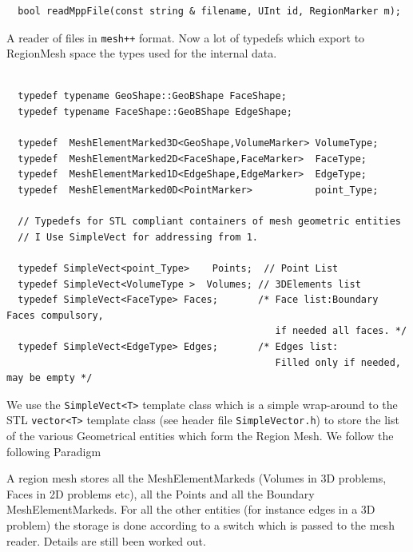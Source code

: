 \begin{verbatim}
  bool readMppFile(const string & filename, UInt id, RegionMarker m);
\end{verbatim}
A reader of files in \texttt{mesh++} format.  Now a lot of typedefs
which export to RegionMesh space the types used for the internal data.
\begin{verbatim}

  typedef typename GeoShape::GeoBShape FaceShape;
  typedef typename FaceShape::GeoBShape EdgeShape;
  
  typedef  MeshElementMarked3D<GeoShape,VolumeMarker> VolumeType;
  typedef  MeshElementMarked2D<FaceShape,FaceMarker>  FaceType;
  typedef  MeshElementMarked1D<EdgeShape,EdgeMarker>  EdgeType;
  typedef  MeshElementMarked0D<PointMarker>           point_Type; 

  // Typedefs for STL compliant containers of mesh geometric entities
  // I Use SimpleVect for addressing from 1.

  typedef SimpleVect<point_Type>    Points;  // Point List
  typedef SimpleVect<VolumeType >  Volumes; // 3DElements list
  typedef SimpleVect<FaceType> Faces;       /* Face list:Boundary Faces compulsory,
                                               if needed all faces. */
  typedef SimpleVect<EdgeType> Edges;       /* Edges list:
                                               Filled only if needed, may be empty */
\end{verbatim}  
We use the \texttt{SimpleVect<T>} template class which is a simple
wrap-around to the STL \texttt{vector<T>} template class (see header file
\texttt{SimpleVector.h}) to store the list of the various 
Geometrical entities which form the Region Mesh. We follow the following Paradigm
\begin{description}
\item A region mesh stores all the MeshElementMarkeds (Volumes in 3D
  problems, Faces in 2D problems etc), all the Points and all the
  Boundary MeshElementMarkeds. For all the other entities (for instance edges
  in a 3D problem) the storage is done according to a switch which is
  passed to the mesh reader.  Details are still been worked out.
\end{description}


